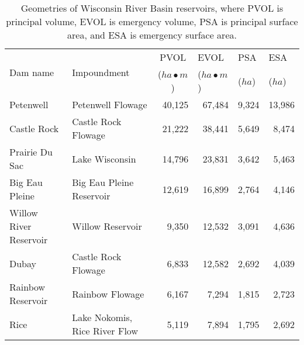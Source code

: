 \begin{table}[h!]
	\caption[Geometries of Wisconsin River Basin reservoirs]{Geometries of Wisconsin River Basin reservoirs, where PVOL is principal volume, EVOL is emergency volume, PSA is principal surface area, and ESA is emergency surface area.}
	\centering
	\begin{tabular}{llrrrr}
\hline
		\multirow{2}{*}{Dam  name} & \multirow{2}{*}{Impoundment}  & \multicolumn{1}{c}{PVOL}             & \multicolumn{1}{l}{EVOL}             & \multicolumn{1}{l}{PSA}    & \multicolumn{1}{l}{ESA}    \\
                                   &                               & \multicolumn{1}{c}{($ha \bullet m$)} & \multicolumn{1}{l}{($ha \bullet m$)} & \multicolumn{1}{l}{($ha$)} & \multicolumn{1}{l}{($ha$)} \\
\hline \hline
		Petenwell                  & Petenwell Flowage             & 40,125                               & 67,484                               & 9,324                      & 13,986                     \\
		Castle Rock                & Castle Rock Flowage           & 21,222                               & 38,441                               & 5,649                      & 8,474                      \\
		Prairie Du Sac             & Lake Wisconsin                & 14,796                               & 23,831                               & 3,642                      & 5,463                      \\
		Big Eau Pleine             & Big Eau Pleine Reservoir      & 12,619                               & 16,899                               & 2,764                      & 4,146                      \\
		Willow River Reservoir     & Willow Reservoir              & 9,350                                & 12,532                               & 3,091                      & 4,636                      \\
		Dubay                      & Castle Rock Flowage           & 6,833                                & 12,582                               & 2,692                      & 4,039                      \\
		Rainbow Reservoir          & Rainbow Flowage               & 6,167                                & 7,294                                & 1,815                      & 2,723                      \\
		Rice                       & Lake Nokomis, Rice River Flow & 5,119                                & 7,894                                & 1,795                      & 2,692                      \\

\end{tabular}
\end{table}
